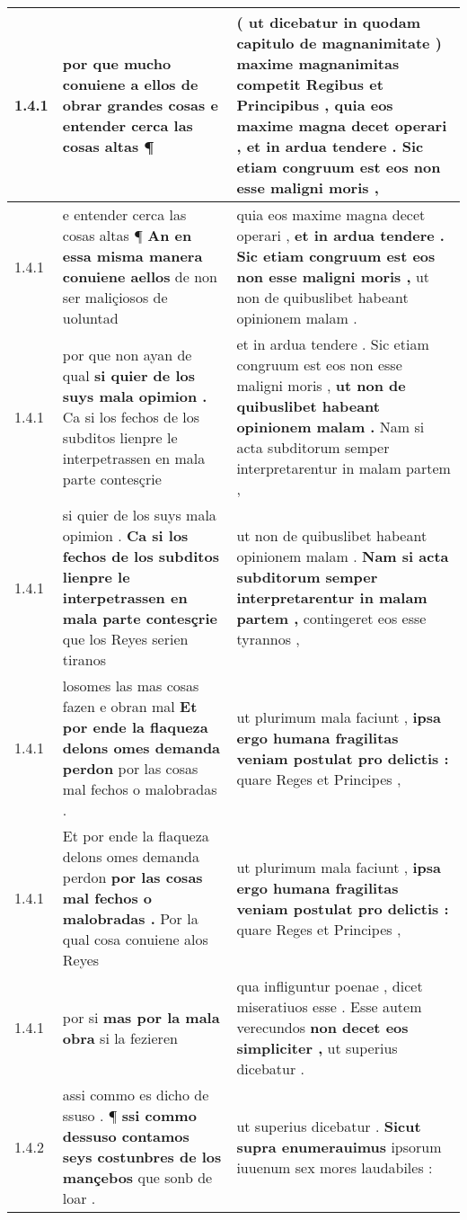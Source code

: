 \begin{tabular}{|p{1cm}|p{6.5cm}|p{6.5cm}|}
1.4.1 & por que mucho conuiene a ellos \textbf{ de obrar grandes cosas } e entender cerca las cosas altas ¶ & ( ut dicebatur in quodam capitulo de magnanimitate ) maxime magnanimitas competit Regibus et Principibus , \textbf{ quia eos maxime magna decet operari , } et in ardua tendere . Sic etiam congruum est eos non esse maligni moris , \\\hline
1.4.1 & e entender cerca las cosas altas ¶ \textbf{ An en essa misma manera conuiene aellos } de non ser maliçiosos de uoluntad & quia eos maxime magna decet operari , \textbf{ et in ardua tendere . Sic etiam congruum est eos non esse maligni moris , } ut non de quibuslibet habeant opinionem malam . \\\hline
1.4.1 & por que non ayan de qual \textbf{ si quier de los suys mala opimion . } Ca si los fechos de los subditos lienpre le interpetrassen en mala parte contesçrie & et in ardua tendere . Sic etiam congruum est eos non esse maligni moris , \textbf{ ut non de quibuslibet habeant opinionem malam . } Nam si acta subditorum semper interpretarentur in malam partem , \\\hline
1.4.1 & si quier de los suys mala opimion . \textbf{ Ca si los fechos de los subditos lienpre le interpetrassen en mala parte contesçrie } que los Reyes serien tiranos & ut non de quibuslibet habeant opinionem malam . \textbf{ Nam si acta subditorum semper interpretarentur in malam partem , } contingeret eos esse tyrannos , \\\hline
1.4.1 & losomes las mas cosas fazen e obran mal \textbf{ Et por ende la flaqueza delons omes demanda perdon } por las cosas mal fechos o malobradas . & ut plurimum mala faciunt , \textbf{ ipsa ergo humana fragilitas veniam postulat pro delictis : } quare Reges et Principes , \\\hline
1.4.1 & Et por ende la flaqueza delons omes demanda perdon \textbf{ por las cosas mal fechos o malobradas . } Por la qual cosa conuiene alos Reyes & ut plurimum mala faciunt , \textbf{ ipsa ergo humana fragilitas veniam postulat pro delictis : } quare Reges et Principes , \\\hline
1.4.1 & por si \textbf{ mas por la mala obra } si la fezieren & qua infliguntur poenae , dicet miseratiuos esse . Esse autem verecundos \textbf{ non decet eos simpliciter , } ut superius dicebatur . \\\hline
1.4.2 & assi commo es dicho de ssuso . ¶ \textbf{ ssi commo dessuso contamos seys costunbres de los mançebos } que sonb de loar . & ut superius dicebatur . \textbf{ Sicut supra enumerauimus } ipsorum iuuenum sex mores laudabiles : \\\hline

\end{tabular}
